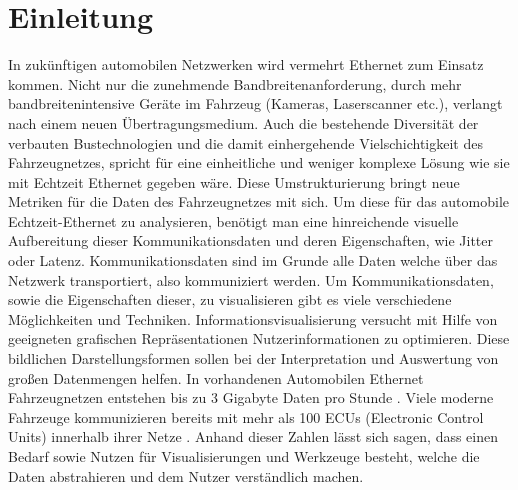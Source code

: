 \documentclass[draft=false
              ,paper=a4
              ,twoside=false
              ,fontsize=11pt
              ,headsepline
              ,BCOR10mm
              ,DIV11
              ]{scrbook}
\begin{document}
\chapter{Einleitung} %
\label{cha:einleitung}
In zukünftigen automobilen Netzwerken wird vermehrt Ethernet zum Einsatz kommen. Nicht nur die zunehmende Bandbreitenanforderung, durch mehr bandbreitenintensive Geräte im Fahrzeug (Kameras, Laserscanner etc.), verlangt nach einem neuen Übertragungsmedium. Auch die bestehende Diversität der verbauten Bustechnologien und die damit einhergehende Vielschichtigkeit des Fahrzeugnetzes, spricht für eine einheitliche und weniger komplexe Lösung wie sie mit Echtzeit Ethernet gegeben wäre. Diese Umstrukturierung bringt neue Metriken für die Daten des Fahrzeugnetzes mit sich. Um diese für das automobile Echtzeit-Ethernet zu analysieren, benötigt man eine hinreichende visuelle Aufbereitung dieser Kommunikationsdaten und deren Eigenschaften, wie Jitter oder Latenz. Kommunikationsdaten sind im Grunde alle Daten welche über das Netzwerk transportiert, also kommuniziert werden. Um Kommunikationsdaten, sowie die Eigenschaften dieser, zu visualisieren gibt es viele verschiedene Möglichkeiten und Techniken. Informationsvisualisierung versucht mit Hilfe von geeigneten grafischen Repräsentationen Nutzerinformationen zu optimieren. Diese bildlichen Darstellungsformen sollen bei der Interpretation und Auswertung von großen Datenmengen helfen. In vorhandenen Automobilen Ethernet Fahrzeugnetzen entstehen bis zu 3 Gigabyte Daten pro Stunde \cite{core_2017}. Viele moderne Fahrzeuge kommunizieren bereits mit mehr als 100 ECUs (Electronic Control Units) innerhalb ihrer Netze \cite{broy_cross-layer_2011}. Anhand dieser Zahlen lässt sich sagen, dass einen Bedarf sowie Nutzen für Visualisierungen und Werkzeuge besteht, welche die Daten abstrahieren und dem Nutzer verständlich machen.
\end{document}
